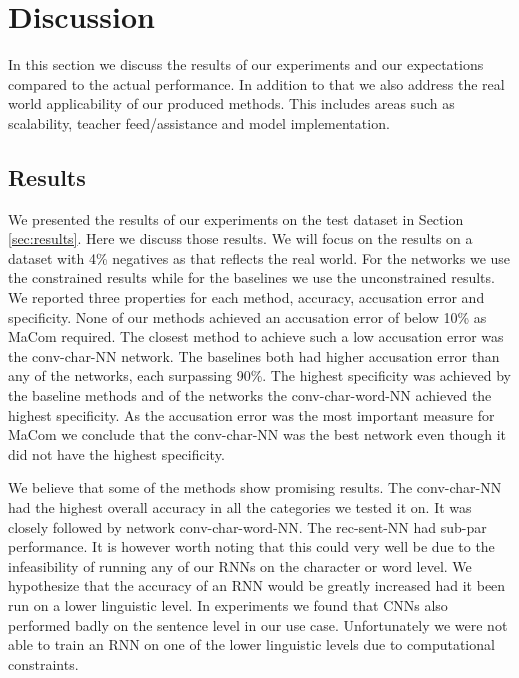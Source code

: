 \section{Discussion} \label{sec:discussion}

In this section we discuss the results of our experiments and our expectations
compared to the actual performance. In addition to that we also address the
real world applicability of our produced methods. This includes areas such as
scalability, teacher feed/assistance and model implementation.


\subsection{Results}

We presented the results of our experiments on the test dataset in Section
\ref{sec:results}. Here we discuss those results. We will focus on the results
on a dataset with 4\% negatives as that reflects the real world. For the
networks we use the constrained results while for the baselines we use the
unconstrained results. We reported three properties for each method, accuracy,
accusation error and specificity. None of our methods achieved an accusation
error of below 10\% as MaCom required. The closest method to achieve such a low
accusation error was the \gls{conv-char-NN} network. The baselines both had
higher accusation error than any of the networks, each surpassing 90\%.
The highest specificity was achieved by the baseline methods and of the
networks the \gls{conv-char-word-NN} achieved the highest specificity. As the
accusation error was the most important measure for MaCom we conclude that the
\gls{conv-char-NN} was the best network even though it did not have the highest
specificity.

We believe that some of the methods show promising results. The
\gls{conv-char-NN} had the highest overall accuracy in all the categories we
tested it on. It was closely followed by network \gls{conv-char-word-NN}. The
\gls{rec-sent-NN} had sub-par performance. It is however worth noting that this
could very well be due to the infeasibility of running any of our \glspl{RNN} on
the character or word level. We hypothesize that the accuracy of an \gls{RNN}
would be greatly increased had it been run on a lower linguistic level. In
experiments we found that \glspl{CNN} also performed badly on the sentence level
in our use case. Unfortunately we were not able to train an \gls{RNN} on one of
the lower linguistic levels due to computational constraints.

